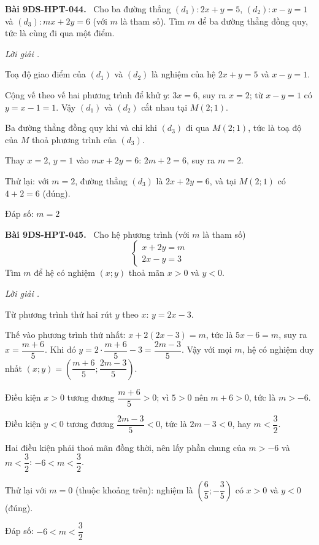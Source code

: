 \documentclass[12pt,a4paper]{article}
\newenvironment{problem}[1][]{\par\medskip\noindent\textbf{Bài #1.}\ }{\par}
\newenvironment{solution}[1][]{\par\noindent\textit{Lời giải #1.}\par}{\par}
\begin{document}
\begin{problem}[9DS-HPT-044]
Cho ba đường thẳng $(d_1)\colon 2x + y = 5$, $(d_2)\colon x - y = 1$ và $(d_3)\colon mx + 2y = 6$ (với $m$ là tham số). Tìm $m$ để ba đường thẳng đồng quy, tức là cùng đi qua một điểm.

\begin{solution}
Toạ độ giao điểm của $(d_1)$ và $(d_2)$ là nghiệm của hệ $2x + y = 5$ và $x - y = 1$.

Cộng vế theo vế hai phương trình để khử $y$: $3x = 6$, suy ra $x = 2$; từ $x - y = 1$ có $y = x - 1 = 1$. Vậy $(d_1)$ và $(d_2)$ cắt nhau tại $M(2; 1)$.

Ba đường thẳng đồng quy khi và chỉ khi $(d_3)$ đi qua $M(2; 1)$, tức là toạ độ của $M$ thoả phương trình của $(d_3)$.

Thay $x = 2$, $y = 1$ vào $mx + 2y = 6$: $2m + 2 = 6$, suy ra $m = 2$.

Thử lại: với $m = 2$, đường thẳng $(d_3)$ là $2x + 2y = 6$, và tại $M(2; 1)$ có $4 + 2 = 6$ (đúng).

Đáp số: $\boxed{m = 2}$
\end{solution}
\end{problem}

\begin{problem}[9DS-HPT-045]
Cho hệ phương trình (với $m$ là tham số)
\[ \begin{cases} x + 2y = m \\ 2x - y = 3 \end{cases} \]
Tìm $m$ để hệ có nghiệm $(x; y)$ thoả mãn $x > 0$ và $y < 0$.

\begin{solution}
Từ phương trình thứ hai rút $y$ theo $x$: $y = 2x - 3$.

Thế vào phương trình thứ nhất: $x + 2(2x - 3) = m$, tức là $5x - 6 = m$, suy ra $x = \dfrac{m + 6}{5}$. Khi đó $y = 2 \cdot \dfrac{m + 6}{5} - 3 = \dfrac{2m - 3}{5}$. Vậy với mọi $m$, hệ có nghiệm duy nhất $(x; y) = \left(\dfrac{m + 6}{5}; \dfrac{2m - 3}{5}\right)$.

Điều kiện $x > 0$ tương đương $\dfrac{m + 6}{5} > 0$; vì $5 > 0$ nên $m + 6 > 0$, tức là $m > -6$.

Điều kiện $y < 0$ tương đương $\dfrac{2m - 3}{5} < 0$, tức là $2m - 3 < 0$, hay $m < \dfrac{3}{2}$.

Hai điều kiện phải thoả mãn đồng thời, nên lấy phần chung của $m > -6$ và $m < \dfrac{3}{2}$: $-6 < m < \dfrac{3}{2}$.

Thử lại với $m = 0$ (thuộc khoảng trên): nghiệm là $\left(\dfrac{6}{5}; -\dfrac{3}{5}\right)$ có $x > 0$ và $y < 0$ (đúng).

Đáp số: $\boxed{-6 < m < \dfrac{3}{2}}$
\end{solution}
\end{problem}
\end{document}
